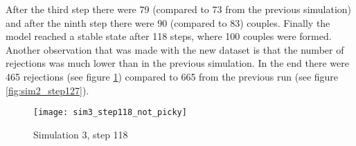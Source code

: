 After the third step there were 79 (compared to 73 from the previous simulation) and after the ninth step there were 90 (compared to 83) couples.
Finally the model reached a stable state after 118 steps, where 100 couples were formed.
Another observation that was made with the new dataset is that the number of rejections was much lower than in the previous simulation. 
In the end there were 465 rejections (see figure \ref{fig:sim3_step118_not_picky}) compared to 665 from the previous run (see figure \ref{fig:sim2_step127}).
\begin{figure}[H]
  \centering
  \texttt{[image: sim3\_step118\_not\_picky]}
	\caption{Simulation 3, step 118}
	\label{fig:sim3_step118_not_picky}
\end{figure}
